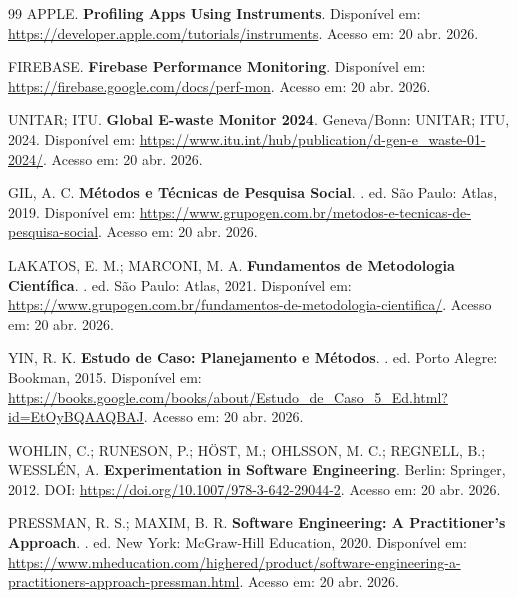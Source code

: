 \begin{thebibliography}{99}
APPLE.
\newblock \textbf{Profiling Apps Using Instruments}.
\newblock Disponível em: \url{https://developer.apple.com/tutorials/instruments}.
\newblock Acesso em: 20 abr. 2026.

FIREBASE.
\newblock \textbf{Firebase Performance Monitoring}.
\newblock Disponível em: \url{https://firebase.google.com/docs/perf-mon}.
\newblock Acesso em: 20 abr. 2026.


UNITAR; ITU.
\newblock \textbf{Global E-waste Monitor 2024}.
\newblock Geneva/Bonn: UNITAR; ITU, 2024.
\newblock Disponível em: \url{https://www.itu.int/hub/publication/d-gen-e_waste-01-2024/}.
\newblock Acesso em: 20 abr. 2026.


GIL, A. C.
\newblock \textbf{Métodos e Técnicas de Pesquisa Social}.
. ed. São Paulo: Atlas, 2019.
\newblock Disponível em: \url{https://www.grupogen.com.br/metodos-e-tecnicas-de-pesquisa-social}.
\newblock Acesso em: 20 abr. 2026.

LAKATOS, E. M.; MARCONI, M. A.
\newblock \textbf{Fundamentos de Metodologia Científica}.
. ed. São Paulo: Atlas, 2021.
\newblock Disponível em: \url{https://www.grupogen.com.br/fundamentos-de-metodologia-cientifica/}.
\newblock Acesso em: 20 abr. 2026.

YIN, R. K.
\newblock \textbf{Estudo de Caso: Planejamento e Métodos}.
. ed. Porto Alegre: Bookman, 2015.
\newblock Disponível em: \url{https://books.google.com/books/about/Estudo_de_Caso_5_Ed.html?id=EtOyBQAAQBAJ}.
\newblock Acesso em: 20 abr. 2026.

WOHLIN, C.; RUNESON, P.; HÖST, M.; OHLSSON, M. C.; REGNELL, B.; WESSLÉN, A.
\newblock \textbf{Experimentation in Software Engineering}.
\newblock Berlin: Springer, 2012.
\newblock DOI: \url{https://doi.org/10.1007/978-3-642-29044-2}.
\newblock Acesso em: 20 abr. 2026.

PRESSMAN, R. S.; MAXIM, B. R.
\newblock \textbf{Software Engineering: A Practitioner's Approach}.
. ed. New York: McGraw-Hill Education, 2020.
\newblock Disponível em: \url{https://www.mheducation.com/highered/product/software-engineering-a-practitioners-approach-pressman.html}.
\newblock Acesso em: 20 abr. 2026.


\end{thebibliography}
